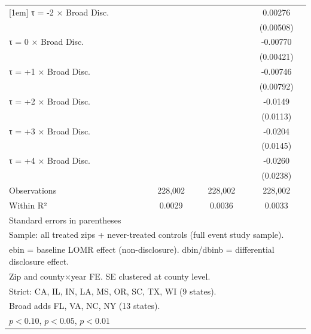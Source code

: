 \begin{table}[htbp]
\begin{tabular}{l*{3}{c}}
[1em]
τ = -2 × Broad Disc.&                     &                     &     0.00276         \\
                    &                     &                     &   (0.00508)         \\
[1em]
τ = 0 × Broad Disc. &                     &                     &    -0.00770\sym{*}  \\
                    &                     &                     &   (0.00421)         \\
[1em]
τ = +1 × Broad Disc.&                     &                     &    -0.00746         \\
                    &                     &                     &   (0.00792)         \\
[1em]
τ = +2 × Broad Disc.&                     &                     &     -0.0149         \\
                    &                     &                     &    (0.0113)         \\
[1em]
τ = +3 × Broad Disc.&                     &                     &     -0.0204         \\
                    &                     &                     &    (0.0145)         \\
[1em]
τ = +4 × Broad Disc.&                     &                     &     -0.0260         \\
                    &                     &                     &    (0.0238)         \\
\hline
Observations        &     228,002         &     228,002         &     228,002         \\
Within R²           &      0.0029         &      0.0036         &      0.0033         \\
\hline\hline
\multicolumn{4}{l}{\footnotesize Standard errors in parentheses}\\
\multicolumn{4}{l}{\footnotesize Sample: all treated zips + never-treated controls (full event study sample).}\\
\multicolumn{4}{l}{\footnotesize ebin = baseline LOMR effect (non-disclosure). dbin/dbinb = differential disclosure effect.}\\
\multicolumn{4}{l}{\footnotesize Zip and county×year FE. SE clustered at county level.}\\
\multicolumn{4}{l}{\footnotesize Strict: CA, IL, IN, LA, MS, OR, SC, TX, WI (9 states).}\\
\multicolumn{4}{l}{\footnotesize Broad adds FL, VA, NC, NY (13 states).}\\
\multicolumn{4}{l}{\footnotesize \sym{*} \(p<0.10\), \sym{**} \(p<0.05\), \sym{***} \(p<0.01\)}\\
\end{tabular}
\end{table}
